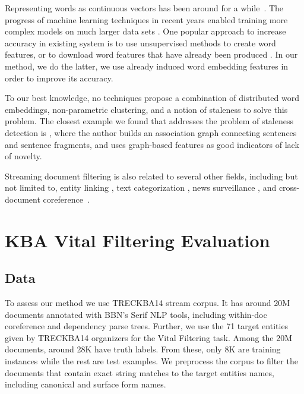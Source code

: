 \documentclass{article}
\begin{document}
Representing words as continuous vectors has been around for a while~\cite{Hinton87, Elman90findingstructure}. 
The progress of machine learning techniques in recent years enabled training more complex models on much larger data sets \cite{mikolovChen}. 
One popular approach to increase accuracy in existing system is to use unsupervised methods to create word features, or to download word features that have already been produced \cite{Turian10wordrepresentations}. In our method, we do the latter, we use already induced word embedding features in order to improve its accuracy.

To our best knowledge, no techniques propose a combination of distributed word embeddings, non-parametric clustering, and a notion of staleness to solve this problem. 
The closest example we found that addresses the problem of staleness detection is \citet{gamon}, where the author builds an association graph connecting sentences and sentence fragments, and uses graph-based features as good indicators of lack of novelty.

Streaming document filtering is also related to several other fields, including but not limited to, entity linking \cite{KBP11}, text categorization \cite{HLTCOE12}, news surveillance \cite{Steinberger14}, and cross-document coreference~\cite{RaoMD10,singh11:acl}.

\section{KBA Vital Filtering Evaluation}
\label{evaluation}

\subsection{Data}
\label{data}

To assess our method we use TRECKBA14 stream corpus. It has around 20M documents annotated with BBN's Serif NLP tools, including within-doc coreference and dependency parse trees. Further, we use the 71 target entities given by TRECKBA14 organizers for the Vital Filtering task. Among the 20M documents, around 28K have truth labels. From these, only 8K are training instances while the rest are test examples.
We preprocess the corpus to filter the documents that contain exact string matches to the target entities names, including canonical and surface form names.
\end{document}
